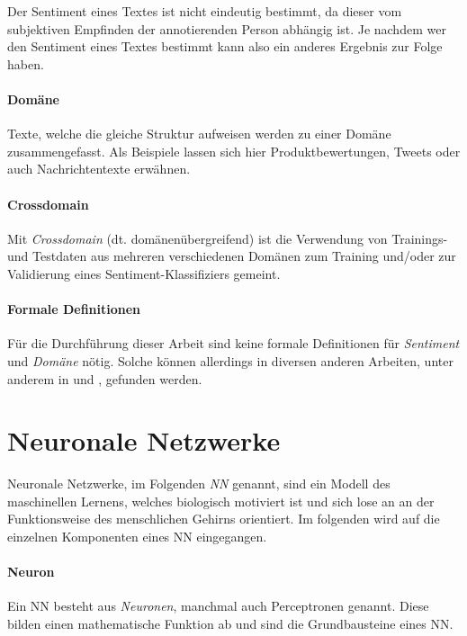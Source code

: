 Der Sentiment eines Textes ist nicht eindeutig bestimmt, da dieser vom subjektiven Empfinden der annotierenden Person abhängig ist. Je nachdem wer den Sentiment eines Textes bestimmt kann also ein anderes Ergebnis zur Folge haben.

\paragraph{Domäne} Texte, welche die gleiche Struktur aufweisen werden zu einer Domäne zusammengefasst. Als Beispiele lassen sich hier Produktbewertungen, Tweets oder auch Nachrichtentexte erwähnen.

\paragraph{Crossdomain} 
Mit \emph{Crossdomain} (dt. domänenübergreifend) ist die Verwendung von Trainings- und Testdaten aus mehreren verschiedenen Domänen zum Training und/oder zur Validierung eines Sentiment-Klassifiziers gemeint.

\paragraph{Formale Definitionen}
Für die Durchführung dieser Arbeit sind keine formale Definitionen für \emph{Sentiment} und \emph{Domäne} nötig. Solche können allerdings in diversen anderen Arbeiten, unter anderem in \cite{Pan:2010} und \cite{Bollegala:2016}, gefunden werden.

\section{Neuronale Netzwerke}
\label{basics:neural_network}

Neuronale Netzwerke, im Folgenden \emph{\gls{NN}} genannt, sind ein Modell des maschinellen Lernens, welches biologisch motiviert ist und sich lose an an der Funktionsweise des menschlichen Gehirns orientiert. Im folgenden wird auf die einzelnen Komponenten eines NN eingegangen.

\paragraph{Neuron}\label{basic:neural_network:neuron} Ein NN besteht aus \emph{Neuronen}, manchmal auch Perceptronen genannt. Diese bilden einen mathematische Funktion ab und sind die Grundbausteine eines NN.

